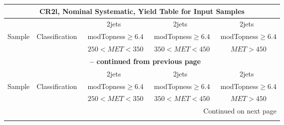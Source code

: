 \documentclass{article}
\begin{document}
\begin{longtable}{|l|c|c|c|c|} 
 
\multicolumn{5}{c}{ CR2l, Nominal Systematic, Yield Table for Input Samples }\\* \hline 
 &  & 2jets  & 2jets  & 2jets \\* 
Sample & Classification  & ~modTopness$\ge6.4$  & ~modTopness$\ge6.4$  & ~modTopness$\ge6.4$ \\* 
 &  & ~$250<MET<350$  & ~$350<MET<450$  & ~$MET>450$ \\* 
\hline \hline 
\endfirsthead 
 
\multicolumn{5}{c}{{\bfseries \tablename\ \thetable{} -- continued from previous page}}\\* \hline 
 &  & 2jets  & 2jets  & 2jets \\* 
Sample & Classification  & ~modTopness$\ge6.4$  & ~modTopness$\ge6.4$  & ~modTopness$\ge6.4$ \\* 
 &  & ~$250<MET<350$  & ~$350<MET<450$  & ~$MET>450$ \\* 
\hline \hline 
\endhead 
 
\multicolumn{5}{|r|}{{Continued on next page}}\\* \hline 
\endfoot 
 
 
\endlastfoot 
 

\end{longtable}
\end{document}
